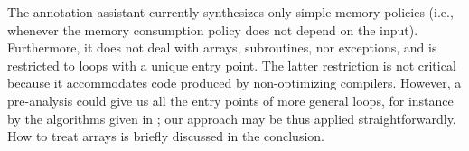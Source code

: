 


The annotation assistant currently synthesizes only simple memory
policies (i.e., whenever the memory consumption policy does not depend
on the input).  Furthermore, it does not deal with arrays,
subroutines, nor exceptions, and is restricted to loops with a unique
entry point. The latter restriction is not critical because it
accommodates code produced by non-optimizing compilers. However, a
pre-analysis could give us all the entry points of more general loops,
for instance by the algorithms given in \cite{CJPS05cmu}; our approach
may be thus applied straightforwardly. How to treat arrays is
briefly discussed in the conclusion.





